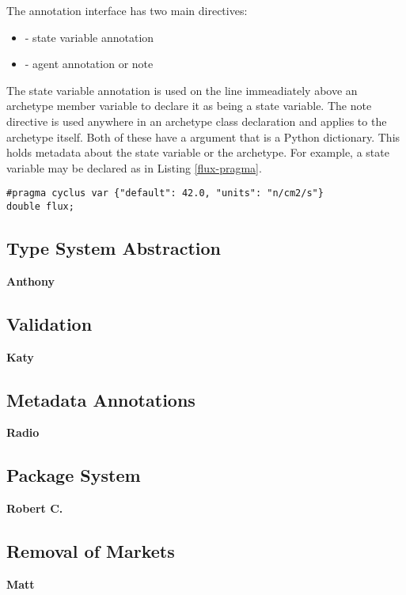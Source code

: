 The \cycpp annotation interface has two main directives:
\begin{itemize}
    \item {} - state variable annotation
    \item {} - agent annotation or note
\end{itemize}
The state variable annotation is used on the line immeadiately above an archetype
member variable to declare it as being a state variable. The note directive is used
anywhere in an archetype class declaration and applies to the archetype itself.
Both of these have a  argument that is a Python dictionary. This 
holds metadata about the state variable or the archetype. For example, a 
state variable may be declared as in Listing \ref{flux-pragma}.

\begin{lstlisting}[caption={Flux State Variable Annotation}, label=flux-pragma]
#pragma cyclus var {"default": 42.0, "units": "n/cm2/s"}
double flux;
\end{lstlisting}



\subsection{Type System Abstraction}

\textbf{Anthony}

\subsection{Validation}

\textbf{Katy}

\subsection{Metadata Annotations}

\textbf{Radio}

\subsection{Package System}

\textbf{Robert C.}

\subsection{Removal of Markets}

\textbf{Matt}
